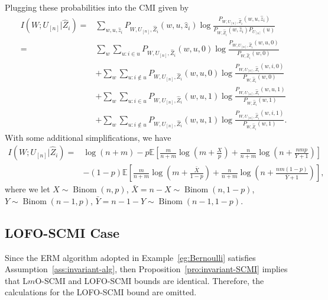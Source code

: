 \documentclass[onecolumn,romanappendices,10pt]{IEEEtran}
\newcommand{\EE}{{\mathbb{E}}}
\DeclareMathOperator{\Binomial}{Binom}
\begin{document}
	Plugging these probabilities into the CMI given by
	\begin{equation}
		\begin{aligned}
			I\left( W; U_{[n]} | \hat{Z}_{i} \right) =& \sum_{w, u, \hat{z}_{i}} P_{W, U_{[n]}, \hat{Z}_{i}}(w, u, \hat{z}_{i}) \log \frac{P_{W, U_{[n]}, \hat{Z}_{i}}(w, u, \hat{z}_{i})}{P_{W, \hat{Z}_{i}}(w, \hat{z}_{i}) P_{U_{[n]}}(u)} \\
			=& \sum_{w} \sum_{u: i \in u} P_{W, U_{[n]}, \hat{Z}_{i}}(w, u, 0) \log \frac{P_{W, U_{[n]}, \hat{Z}_{i}}(w, u, 0)}{P_{W, \hat{Z}_{i}}(w, 0)} \\
			& + \sum_{w} \sum_{u: i \not\in u} P_{W, U_{[n]}, \hat{Z}_{i}}(w, u, 0) \log \frac{P_{W, U_{[n]}, \hat{Z}_{i}}(w, i, 0)}{P_{W, \hat{Z}_{i}}(w, 0)} \\
			& + \sum_{w} \sum_{u: i \in u} P_{W, U_{[n]}, \hat{Z}_{i}}(w, u, 1) \log \frac{P_{W, U_{[n]}, \hat{Z}_{i}}(w, u, 1)}{P_{W, \hat{Z}_{i}}(w, 1)} \\
			& + \sum_{w} \sum_{u: i \not\in u} P_{W, U_{[n]}, \hat{Z}_{i}}(w, u, 1) \log \frac{P_{W, U_{[n]}, \hat{Z}_{i}}(w, i, 1)}{P_{W, \hat{Z}_{i}}(w, 1)}.
		\end{aligned}
	\end{equation}
	With some additional simplifications, we have
	\begin{equation}
		\begin{aligned}
			I\left( W; U_{[n]} | \hat{Z}_{i} \right) =& \log (n + m) - p \EE \left[ \frac{m}{n + m} \log \left( m + \frac{X}{p} \right) + \frac{n}{n + m} \log \left( n + \frac{n m p}{Y + 1} \right) \right] \\
			&- (1 - p) \EE \left[ \frac{m}{n + m} \log \left( m + \frac{\bar{X}}{1 - p} \right) + \frac{n}{n + m} \log \left( n + \frac{n m (1 - p)}{\bar{Y} + 1} \right) \right],
		\end{aligned}
		\label{eq:Ber_LmO_SCMI}
	\end{equation}
	where we let $X \sim \Binomial(n, p)$, $\bar{X} = n - X \sim \Binomial(n, 1 - p)$, $Y \sim \Binomial(n - 1, p)$, $\bar{Y} = n - 1 - Y \sim \Binomial(n - 1, 1 - p)$.
	
	\subsection{LOFO-SCMI Case} \label{subapp:cal_LOFO_SCMI}
	Since the ERM algorithm adopted in Example~\ref{eg:Bernoulli} satisfies Assumption~\ref{ass:invariant-alg}, then Proposition~\ref{pro:invariant-SCMI} implies that L$m$O-SCMI and LOFO-SCMI bounds are identical. Therefore, the calculations for the LOFO-SCMI bound are omitted.
\end{document}
